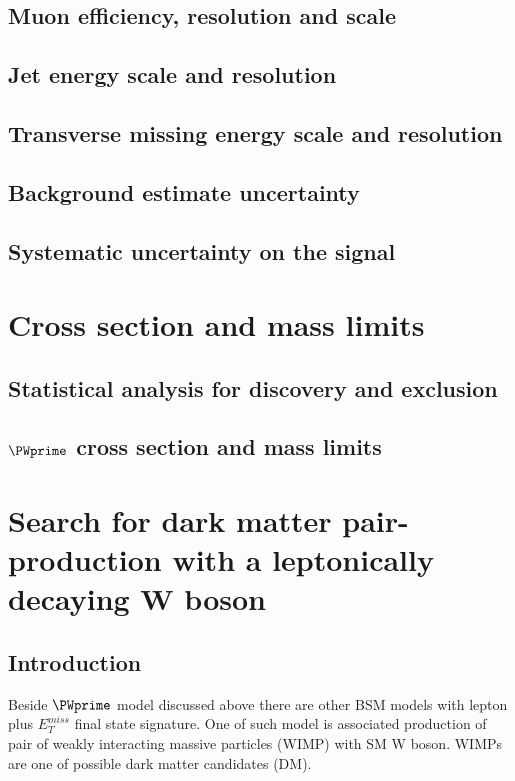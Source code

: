 \subsection{Muon efficiency, resolution and scale}
\subsection{Jet energy scale and resolution}
\subsection{Transverse missing energy scale and resolution}
\subsection{Background estimate uncertainty}
\subsection{Systematic uncertainty on the signal}

\section{Cross section and mass limits}
\subsection{Statistical analysis for discovery and exclusion}
\subsection{$\PWprime$ cross section and mass limits}



% 
% 


\section{Search for dark matter pair-production with a leptonically decaying W boson}
\label{chap:monoW}

\subsection{Introduction}

Beside $\PWprime$ model discussed above there are other BSM models 
with lepton plus $E_{T}^{miss}$ final state signature.
One of such model is associated 
production of pair of weakly interacting massive particles (WIMP)
with SM W boson. WIMPs are one of possible dark matter candidates (DM).

